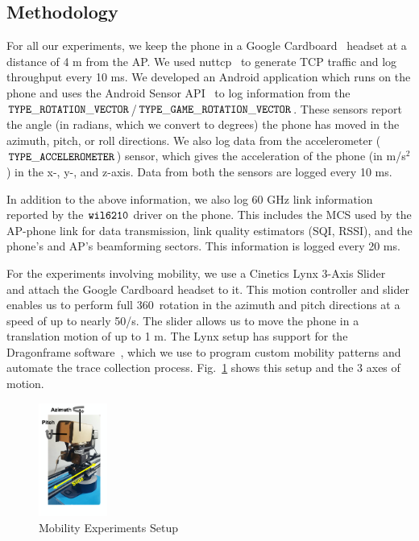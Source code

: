 \documentclass[sigconf,anonymous]{acmart}
\begin{document}
\subsection{Methodology}

For all our experiments, we keep the phone in a Google
Cardboard~\cite{cardboard} headset at a distance of 4 m from the
AP. We used nuttcp~\cite{nuttcp} to generate TCP traffic and log
throughput every 10 ms. We developed an Android application which runs
on the phone and uses the Android Sensor API~\cite{android-sensor} to
log information from the
$\tt{TYPE\_ROTATION\_VECTOR}$/$\tt{TYPE\_GAME\_ROTATION\_VECTOR}$. These
sensors report the angle (in radians, which we convert to degrees) the
phone has moved in the azimuth, pitch, or roll directions. We also log
data from the accelerometer ($\tt{TYPE\_ACCELEROMETER}$) sensor, which
gives the acceleration of the phone (in m/s$^2$) in the x-, y-, and
z-axis. Data from both the sensors are logged every 10 ms.

In addition to the above information, we also log 60 GHz link information reported by the $\tt{wil6210}$ driver on the phone. This includes the MCS used by the AP-phone link for data transmission, link quality estimators (SQI, RSSI), and the phone's and AP's beamforming sectors. This information is logged every 20 ms.

For the experiments involving mobility, we use a Cinetics Lynx 3-Axis Slider~\cite{cinetics-lynx} and attach the Google Cardboard headset to it. This motion controller and slider enables us to perform full 360\degree~rotation in the azimuth and pitch directions at a speed of up to nearly 50\degree/s. The slider allows us to move the phone in a translation motion of up to 1 m. The Lynx setup has support for the Dragonframe software~\cite{dragonframe}, which we use to program custom mobility patterns and automate the trace collection process. Fig.~\ref{fig:setup} shows this setup and the 3 axes of motion.


\begin{figure}[t]
    \centering
    \includegraphics[width=0.2\textwidth]{setup.png}
    \caption{Mobility Experiments Setup}
    \label{fig:setup}
\end{figure}
\end{document}
